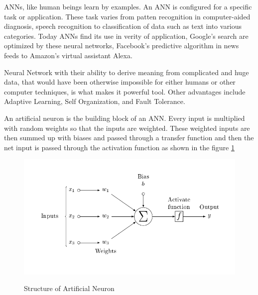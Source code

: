 \documentclass[12pt, a4paper]{report}
\begin{document}
ANNs, like human beings learn by examples. An ANN is configured for a specific task or application. These task varies from patten recognition in computer-aided diagnosis, speech recognition to classification of data such as text into various categories. Today ANNs find its use in verity of application, Google's search are optimized by these neural networks, Facebook's predictive algorithm in news feeds to Amazon's virtual assistant Alexa. \\ \par

Neural Network with their ability to derive meaning from complicated and huge data, that would have been otherwise impossible for either humans or other computer techniques, is what makes it powerful tool. Other advantages include Adaptive Learning, Self Organization, and Fault Tolerance.\\ \par

An artificial neuron is the building block of an ANN. Every input is multiplied with random weights so that the inputs are weighted. These weighted inputs are then summed up with biases and passed through a transfer function and then the net input is passed through the activation function as shown in the figure \ref{fig:AN} \\ \par
\begin{figure}[h]
\centering	
\includegraphics[width=12cm]{ArtificialNeuronModel.png}\\
\caption{Structure of Artificial Neuron}
\label{fig:AN}
\end{figure} 	
\end{document}
